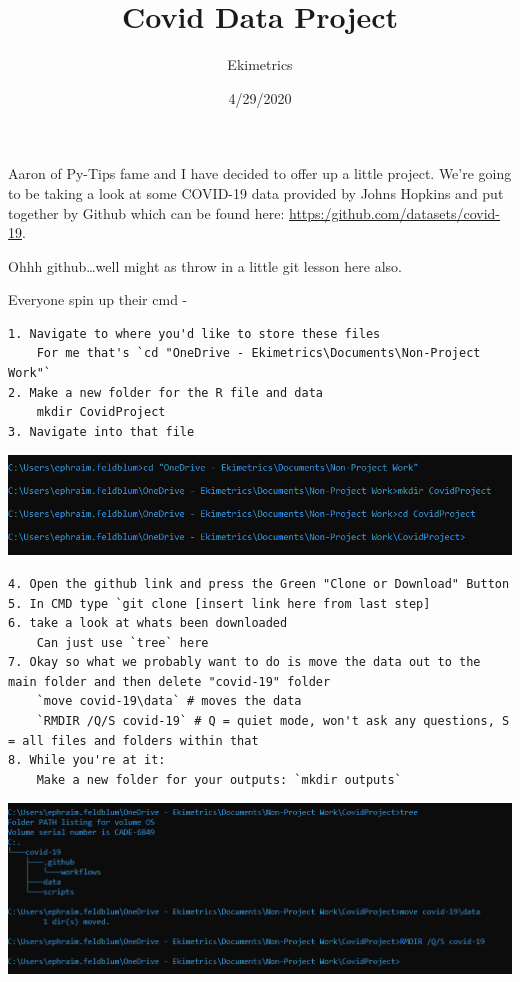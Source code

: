 \documentclass[
]{article}
\title{Covid Data Project}
\author{Ekimetrics}
\date{4/29/2020}
\begin{document}
\maketitle

Aaron of Py-Tips fame and I have decided to offer up a little project.
We're going to be taking a look at some COVID-19 data provided by Johns
Hopkins and put together by Github which can be found here:
\url{https:/github.com/datasets/covid-19}.

Ohhh github\ldots well might as throw in a little git lesson here also.

Everyone spin up their cmd -

\begin{verbatim}
1. Navigate to where you'd like to store these files
    For me that's `cd "OneDrive - Ekimetrics\Documents\Non-Project Work"`
2. Make a new folder for the R file and data
    mkdir CovidProject
3. Navigate into that file
\end{verbatim}

\includegraphics{1.png}

\begin{verbatim}
4. Open the github link and press the Green "Clone or Download" Button
5. In CMD type `git clone [insert link here from last step]
6. take a look at whats been downloaded
    Can just use `tree` here
7. Okay so what we probably want to do is move the data out to the main folder and then delete "covid-19" folder
    `move covid-19\data` # moves the data
    `RMDIR /Q/S covid-19` # Q = quiet mode, won't ask any questions, S = all files and folders within that
8. While you're at it:  
    Make a new folder for your outputs: `mkdir outputs`
\end{verbatim}

\includegraphics{2.png}
\end{document}
